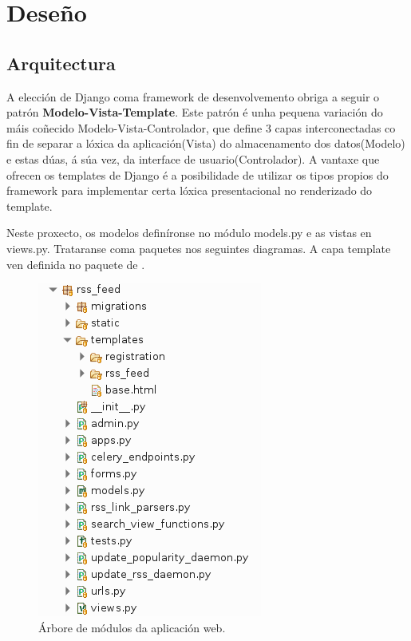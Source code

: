 \chapter[Deseño]{
  \label{chp:disenho}
  Deseño
}
\minitoc
\newpage

\section{Arquitectura}

A elección de Django coma framework de desenvolvemento obriga a seguir o patrón \textbf{Modelo-Vista-Template}. Este patrón é unha pequena variación do máis coñecido Modelo-Vista-Controlador, que define 3 capas interconectadas co fin de separar a lóxica da aplicación(Vista) do almacenamento dos datos(Modelo) e estas dúas, á súa vez, da interface de usuario(Controlador). A vantaxe que ofrecen os templates de Django é a posibilidade de utilizar os tipos propios do framework para implementar certa lóxica presentacional no renderizado do template.

Neste proxecto, os modelos  definíronse no módulo models.py e as vistas en views.py. Trataranse coma paquetes nos seguintes diagramas. A capa template ven definida no paquete de .

\begin{figure}[h]
	\centering
	\includegraphics[scale=0.6,keepaspectratio=true]{./images/project_tree.png}
	\caption{Árbore de módulos da aplicación  web.}
	\label{fig:project_tree}
\end{figure}



